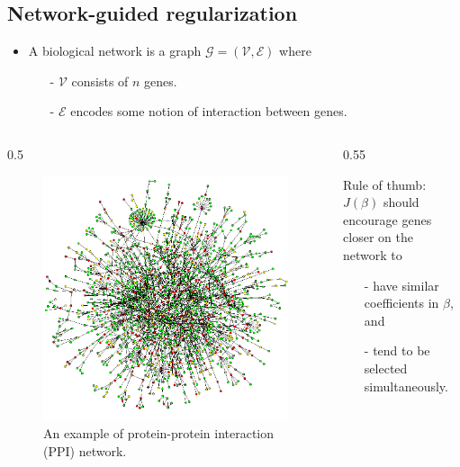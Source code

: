 \documentclass[xcolor=x11names,compress]{beamer}
\theoremstyle{plain}
\renewcommand{\(}{\begin{columns}}
\renewcommand{\)}{\end{columns}}
\newcommand{\<}[1]{\begin{column}{#1}}
\renewcommand{\>}{\end{column}}
\begin{document}
\subsection{Network-guided regularization}
\begin{frame}{\insertsubsection}
	
	\begin{itemize}
		\item A biological network is a graph $\mathcal{G} = (\mathcal{V}, \mathcal{E})$ where
		\begin{itemize}
			\item[-] $\mathcal{V}$ consists of $n$ genes.
			\item[-] $\mathcal{E}$ encodes some notion of interaction between genes.
		\end{itemize}
	\end{itemize}
	
	\vskip -0.1in
	
	\(
	\<{0.5\linewidth}
	\begin{figure}
	\begin{center}
		\includegraphics[width=0.9\columnwidth]{slides/ppi}
		\vskip -0.1in
		\caption{An example of protein-protein interaction (PPI) network.}
	\end{center}
	\end{figure}
	\>
	\hskip -0.3cm
	\<{0.55\linewidth}
	\begin{framed}
	\alert{Rule of thumb:}\\
	$J(\beta)$ should encourage genes closer on the network to
	\begin{itemize}
		\item[-] have similar coefficients in $\beta$, and
		\item[-] tend to be selected simultaneously.
	\end{itemize}
	\end{framed}
	\>
	\)
	
\end{frame}
\end{document}
